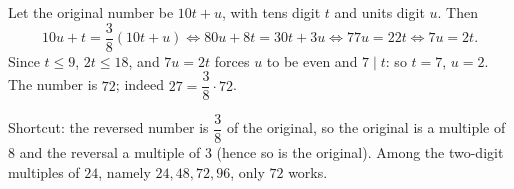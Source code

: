 Let the original number be $10t+u$, with tens digit $t$ and units digit $u$. Then
\[
10u+t=\dfrac{3}{8}(10t+u)\iff80u+8t=30t+3u\iff77u=22t\iff7u=2t .
\]
Since $t\le9$, $2t\le18$, and $7u=2t$ forces $u$ to be even and $7\mid t$: so $t=7$, $u=2$. The number is $\boxed{72}$; indeed $27=\dfrac{3}{8}\cdot72$.

Shortcut: the reversed number is $\dfrac{3}{8}$ of the original, so the original is a multiple of $8$ and the reversal a multiple of $3$ (hence so is the original). Among the two-digit multiples of $24$, namely $24,48,72,96$, only $72$ works.
